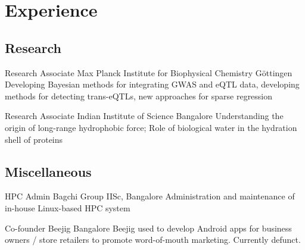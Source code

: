 \section{Experience}
\subsection{Research}
        {Research Associate}
        {Max Planck Institute for Biophysical Chemistry}
        {G\"ottingen}
        {}
        {Developing Bayesian methods for integrating GWAS and eQTL data, developing methods for detecting trans-eQTLs, new approaches for sparse regression}

        {Research Associate}
        {Indian Institute of Science}
        {Bangalore}
        {}
        {Understanding the origin of long-range hydrophobic force; Role of biological water in the hydration shell of proteins}

\subsection{Miscellaneous}
        {HPC Admin}
        {Bagchi Group}
        {IISc, Bangalore}
        {}
        {Administration and maintenance of in-house Linux-based HPC system}

        {Co-founder}
        {Beejig}
        {Bangalore}
        {}
        {Beejig used to develop Android apps for business owners / store retailers to promote word-of-mouth marketing. Currently defunct.}
